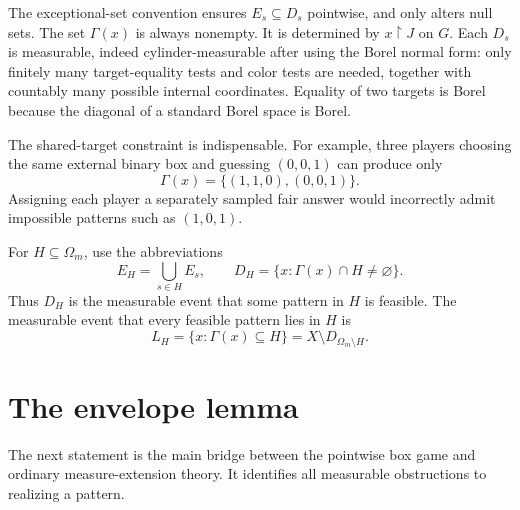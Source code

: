 \documentclass[11pt,letterpaper]{article}
\theoremstyle{definition}
\newcommand{\restr}{\mathbin{\upharpoonright}}
\begin{document}
The exceptional-set convention ensures $E_s\subseteq D_s$ pointwise, and only alters null sets. The set $\Gamma(x)$ is always nonempty. It is determined by $x\restr J$ on $G$. Each $D_s$ is measurable, indeed cylinder-measurable after using the Borel normal form: only finitely many target-equality tests and color tests are needed, together with countably many possible internal coordinates. Equality of two targets is Borel because the diagonal of a standard Borel space is Borel.

The shared-target constraint is indispensable. For example, three players choosing the same external binary box and guessing $(0,0,1)$ can produce only
\begin{equation}
\Gamma(x)=\{(1,1,0),(0,0,1)\}.
\label{mbg:ext:eq:shared}
\end{equation}
Assigning each player a separately sampled fair answer would incorrectly admit impossible patterns such as $(1,0,1)$.

For $H\subseteq\Omega_m$, use the abbreviations
\[
E_H=\bigcup_{s\in H}E_s,\qquad
D_H=\{x:\Gamma(x)\cap H\ne\varnothing\}.
\]
Thus $D_H$ is the measurable event that some pattern in $H$ is feasible. The measurable event that every feasible pattern lies in $H$ is
\[
L_H=\{x:\Gamma(x)\subseteq H\}=X\setminus D_{\Omega_m\setminus H}.
\]

\section{The envelope lemma}
\label{mbg:ext:sec:envelope}

The next statement is the main bridge between the pointwise box game and ordinary measure-extension theory. It identifies all measurable obstructions to realizing a pattern.
\end{document}
